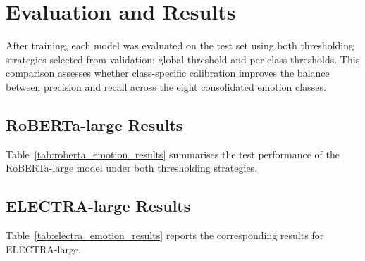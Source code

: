 \section{Evaluation and Results}

After training, each model was evaluated on the test set using both thresholding strategies selected from validation: global threshold and per-class thresholds. This comparison assesses whether class-specific calibration improves the balance between precision and recall across the eight consolidated emotion classes.

\subsection{RoBERTa-large Results}
Table~\ref{tab:roberta_emotion_results} summarises the test performance of the \acs{RoBERTa}-large model under both thresholding strategies.

\begin{table}[htbp]
\centering
\small
\caption{Test set results for \acs{RoBERTa}-large using global and per-class thresholds.}
\label{tab:roberta_emotion_results}
\end{table}

\subsection{ELECTRA-large Results}
Table~\ref{tab:electra_emotion_results} reports the corresponding results for \acs{ELECTRA}-large.

\begin{table}[htbp]
\centering
\small
\caption{Test set results for \acs{ELECTRA}-large using global and per-class thresholds.}
\label{tab:electra_emotion_results}
\end{table}

